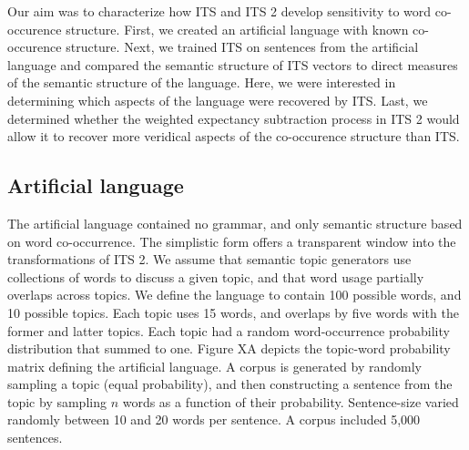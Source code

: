 \documentclass[
  jou]{apa6}
\begin{document}
Our aim was to characterize how ITS and ITS 2 develop sensitivity to word co-occurence structure. First, we created an artificial language with known co-occurence structure. Next, we trained ITS on sentences from the artificial language and compared the semantic structure of ITS vectors to direct measures of the semantic structure of the language. Here, we were interested in determining which aspects of the language were recovered by ITS. Last, we determined whether the weighted expectancy subtraction process in ITS 2 would allow it to recover more veridical aspects of the co-occurence structure than ITS.

\hypertarget{artificial-language}{%
\subsection{Artificial language}\label{artificial-language}}

The artificial language contained no grammar, and only semantic structure based on word co-occurrence. The simplistic form offers a transparent window into the transformations of ITS 2. We assume that semantic topic generators use collections of words to discuss a given topic, and that word usage partially overlaps across topics. We define the language to contain 100 possible words, and 10 possible topics. Each topic uses 15 words, and overlaps by five words with the former and latter topics. Each topic had a random word-occurrence probability distribution that summed to one. Figure XA depicts the topic-word probability matrix defining the artificial language. A corpus is generated by randomly sampling a topic (equal probability), and then constructing a sentence from the topic by sampling \(n\) words as a function of their probability. Sentence-size varied randomly between 10 and 20 words per sentence. A corpus included 5,000 sentences.
\end{document}

